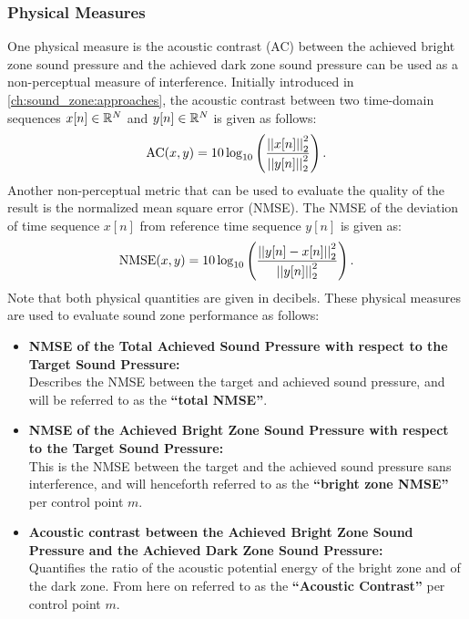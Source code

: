 \subsubsection{Physical Measures}
One physical measure is the acoustic contrast (AC) between the 
achieved bright zone sound pressure and the achieved dark zone sound pressure can be used as a non-perceptual measure of interference.
Initially introduced in \autoref{ch:sound_zone:approaches}, 
the acoustic contrast between two time-domain sequences $x[n]\in\mathbb{R}^{N}$
and $y[n]\in\mathbb{R}^{N}$ is given as follows: 
\begin{equation}
    \mathrm{AC}(x,y) = 10\log_{10}\left(\frac{\norm[2][2]{x[n]}}{\norm[2][2]{y[n]}}\right).
\end{equation}
Another non-perceptual metric that can be used to evaluate the quality of the result is the normalized mean square error (NMSE).
The NMSE of the deviation of time sequence $x[n]$ from reference time sequence $y[n]$ is given as:
\begin{equation}
    \text{NMSE}(x,y) = 10\log_{10}\left(\frac{\norm[2][2]{y[n] - x[n]}}{\norm[2][2]{y[n]}}\right).
\end{equation}
Note that both physical quantities are given in decibels.
These physical measures are used to evaluate sound zone performance as follows:
\begin{itemize}
    \item \textbf{NMSE of the Total Achieved Sound Pressure with respect to the Target Sound Pressure:}\\
        Describes the NMSE between the target and achieved sound pressure, and will be referred to as the 
        \textbf{``total NMSE''}.
    \item \textbf{NMSE of the Achieved Bright Zone Sound Pressure with respect to the Target Sound Pressure:}\\
        This is the NMSE between the target and the achieved sound pressure sans interference, 
        and will henceforth referred to as the \textbf{``bright zone NMSE''} per control point $m$.
    \item \textbf{Acoustic contrast between the Achieved Bright Zone Sound Pressure and the 
        Achieved Dark Zone Sound Pressure:}\\
        Quantifies the ratio of the acoustic potential energy of the bright zone and of the dark zone.
        From here on referred to as the \textbf{``Acoustic Contrast''} per control point $m$.
\end{itemize}
